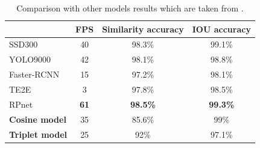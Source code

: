 \documentclass{report}[12pt, a4paper]
\begin{document}
\begin{table}[ht]
    \begin{tabular}{lccc}
    \hline
                                        & FPS           & Similarity accuracy & IOU accuracy    \\ \hline
    SSD300\cite{ssd300}                 & 40            & 98.3\%              & 99.1\%          \\ \hline
    YOLO9000\cite{yolo9000}             & 42            & 98.1\%              & 98.8\%          \\ \hline
    Faster-RCNN\cite{faster_rcnn_paper} & 15            & 97.2\%              & 98.1\%          \\ \hline
    TE2E\cite{te2e}                     & 3             & 97.8\%              & 98.5\%          \\ \hline
    RPnet\cite{carplate_dataset_paper}  & \textbf{61}   & \textbf{98.5\%}     & \textbf{99.3\%} \\ \hline
    \textbf{Cosine model}               & 35            & 85.6\%              & 99\%            \\ \hline
    \textbf{Triplet model}              & 25            & 92\%                & 97.1\%          \\ \hline
    \end{tabular}
    \centering
    \caption{Comparison with other models results which are taken from \cite{carplate_dataset_paper}.}
    \label{table:results_comparison}
\end{table}
\end{document}
